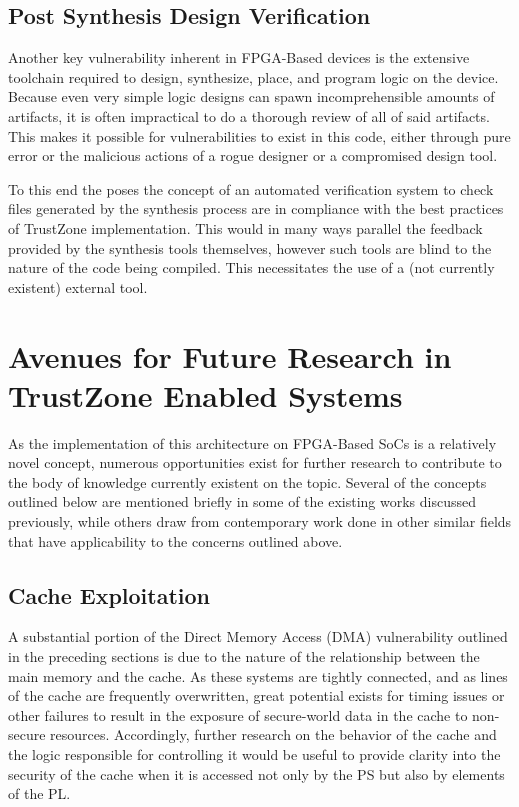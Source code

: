 \documentclass[journal]{IEEEtran}
\begin{document}
\subsection{Post Synthesis Design Verification}
Another key vulnerability inherent in FPGA-Based devices is the extensive toolchain
required to design, synthesize, place, and program logic on the device. Because even very
simple logic designs can spawn incomprehensible amounts of artifacts, it is often
impractical to do a thorough review of all of said artifacts. This makes it possible for
vulnerabilities to exist in this code, either through pure error or the malicious actions
of a rogue designer or a compromised design tool. 

To this end the \cite{benhani_security_2019} poses the concept of an automated
verification system to check files generated by the synthesis process are in compliance
with the best practices of TrustZone implementation. This would in many ways parallel the
feedback provided by the synthesis tools themselves, however such tools are blind to the
nature of the code being compiled. This necessitates the use of a (not currently existent)
external tool.

\section{Avenues for Future Research in TrustZone Enabled Systems}
As the implementation of this architecture on FPGA-Based SoCs is a relatively novel
concept, numerous opportunities exist for further research to contribute to the body of
knowledge currently existent on the topic. Several of the concepts outlined below are
mentioned briefly in some of the existing works discussed previously, while others draw
from contemporary work done in other similar fields that have applicability to the concerns
outlined above.

\subsection{Cache Exploitation}
A substantial portion of the Direct Memory Access (DMA) vulnerability outlined in the 
preceding sections is due to the nature of the relationship between the main memory and
the cache. As these systems are tightly connected, and as lines of the cache are
frequently overwritten, great potential exists for timing issues or other failures to
result in the exposure of secure-world data in the cache to non-secure resources.
Accordingly, further research on the behavior of the cache and the logic responsible for
controlling it would be useful to provide clarity into the security of the cache when it
is accessed not only by the PS but also by elements of the PL.
\end{document}
